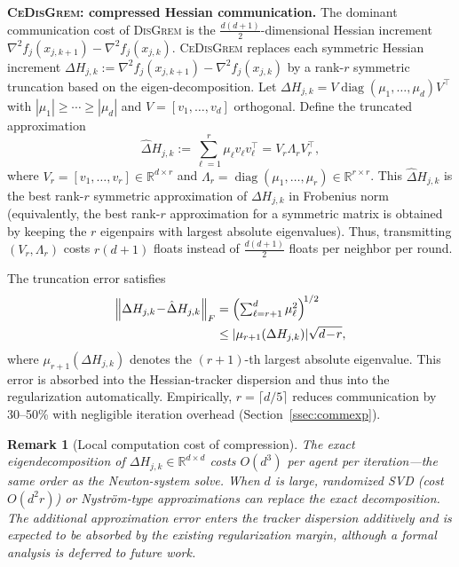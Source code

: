 \documentclass[10pt,twocolumn,letterpaper]{article}
\def\cO{O}%
\theoremstyle{compact}
\theoremstyle{compactremark}
\newtheorem{remark}[theorem]{Remark}
\newcommand{\R}{\mathbb{R}}
\newcommand{\normF}[1]{\left\|#1\right\|_F}
\newcommand{\cO}{\mathcal{O}}
\begin{document}
\noindent\textbf{\textsc{CeDisGrem}: compressed Hessian communication.}
The dominant communication cost of \textsc{DisGrem} is the $\frac{d(d+1)}{2}$-dimensional
Hessian increment $\nabla^2 f_j(x_{j,k+1})-\nabla^2 f_j(x_{j,k})$.
\textsc{CeDisGrem} replaces each symmetric Hessian increment
$\Delta H_{j,k}:=\nabla^2 f_j(x_{j,k+1})-\nabla^2 f_j(x_{j,k})$
by a rank-$r$ symmetric truncation based on the eigen-decomposition.
Let $\Delta H_{j,k}=V\operatorname{diag}(\mu_1,\dots,\mu_d)V^\top$ with
$|\mu_1|\ge \cdots \ge |\mu_d|$ and $V=[v_1,\dots,v_d]$ orthogonal.
Define the truncated approximation
\[
\hat\Delta H_{j,k}:=\sum_{\ell=1}^r \mu_\ell v_\ell v_\ell^\top
= V_r\Lambda_r V_r^\top,
\]
where $V_r=[v_1,\dots,v_r]\in\R^{d\times r}$ and $\Lambda_r=\operatorname{diag}(\mu_1,\dots,\mu_r)\in\R^{r\times r}$.
This $\hat\Delta H_{j,k}$ is the best rank-$r$ symmetric approximation of $\Delta H_{j,k}$ in Frobenius norm
(equivalently, the best rank-$r$ approximation for a symmetric matrix is obtained by keeping the $r$
eigenpairs with largest absolute eigenvalues).
Thus, transmitting $(V_r,\Lambda_r)$ costs $r(d+1)$ floats instead of $\frac{d(d+1)}{2}$ floats per neighbor per round.

The truncation error satisfies
\begin{align*}
\normF{\Delta H_{j,k}\!-\!\hat\Delta H_{j,k}}
&=\Bigl(\textstyle\sum_{\ell=r+1}^d \mu_\ell^2\Bigr)^{\!1/2}\\
&\le |\mu_{r+1}(\Delta H_{j,k})|\sqrt{d\!-\!r},
\end{align*}
where $\mu_{r+1}(\Delta H_{j,k})$ denotes the $(r+1)$-th largest absolute eigenvalue.
This error is absorbed into the Hessian-tracker dispersion and thus into the regularization automatically.
Empirically, $r=\lceil d/5\rceil$ reduces communication by 30--50\% with negligible iteration overhead
(Section~\ref{ssec:commexp}).

\begin{remark}[Local computation cost of compression]
The exact eigendecomposition of $\Delta H_{j,k}\in\R^{d\times d}$
costs $\cO(d^3)$ per agent per iteration---the same order as the
Newton-system solve.
When $d$ is large, randomized SVD
(cost $\cO(d^2 r)$) or Nystr\"om-type approximations can replace
the exact decomposition.
The additional approximation error enters the tracker dispersion
additively and is expected to be absorbed by the existing
regularization margin, although a formal analysis is deferred to
future work.
\end{remark}
	
\end{document}

